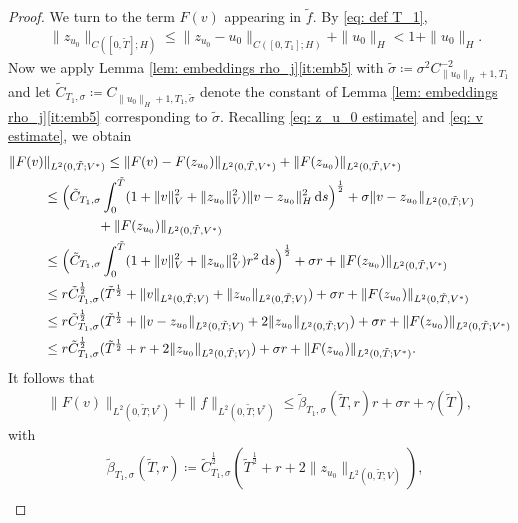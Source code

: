 \documentclass{amsart}
\newcommand{\dd}{\,\mathrm{d}}
\newcommand{\<}{\langle}
\newcommand{\?}{\rangle}
\theoremstyle{plain}
\theoremstyle{remark}
\theoremstyle{plain}
\numberwithin{equation}{section}
\begin{document}
\begin{proof}
We turn to the term $F(v)$ appearing in $\tilde{f}$.
By \eqref{eq: def T_1},
\begin{align}\label{eq: z_u_0 estimate}
& \|z_{u_0}\|_{C([0,\tilde{T}];H)}\leq \|z_{u_0}-u_0\|_{C([0,T_1];H)}+\|u_0\|_H<1+\|u_0\|_H.
\end{align}
Now we apply  Lemma \ref{lem: embeddings rho_j}\ref{it:emb5} with  $\tilde{\sigma}\coloneqq \sigma^2{C}_{\|u_0\|_H+1,T_1}^{-2}$ and let  
 $\tilde{C}_{T_1,\sigma}\coloneqq C_{\|u_0\|_H+1,T_1,\tilde{\sigma}}$ denote the constant of Lemma \ref{lem: embeddings rho_j}\ref{it:emb5} corresponding to $\tilde{\sigma}$. 
Recalling \eqref{eq: z_u_0 estimate} and \eqref{eq: v estimate}, we obtain
\begin{align*}
  \|F(v)&\|_{L^2(0,\tilde{T};V^*)}\leq \|F(v)-F(z_{u_0})\|_{L^2(0,\tilde{T},V^*)}+\|F(z_{u_0})\|_{L^2(0,\tilde{T},V^*)}\notag\\
  &\leq \Big(\tilde{C}_{T_1,\sigma}\int_0^{\tilde{T}}(1+\|v\|_V^2+\|z_{u_0}\|_V^2)\|v-z_{u_0}\|_H^2\dd s\Big)^{\frac{1}{2}} +\sigma 
  \|v-z_{u_0}\|_{L^2(0,\tilde{T};V)}\notag\\
  &\qquad\qquad+\|F(z_{u_0})\|_{L^2(0,\tilde{T},V^*)}\notag\\
  &\leq \Big(\tilde{C}_{T_1,\sigma}\int_0^{\tilde{T}}(1+\|v\|_V^2+\|z_{u_0}\|_V^2)r^2\dd s\Big)^{\frac{1}{2}}
  +\sigma r 
  +\|F(z_{u_0})\|_{L^2(0,\tilde{T},V^*)}\notag\\
&\leq r\tilde{C}_{T_1,\sigma}^{\frac{1}{2}}(\tilde{T}^{\frac{1}{2}}+\|v\|_{L^2(0,\tilde{T};V)}+\|z_{u_0}\|_{L^2(0,\tilde{T};V)})+\sigma r 
+\|F(z_{u_0})\|_{L^2(0,\tilde{T},V^*)} \notag\\
&\leq r\tilde{C}_{T_1,\sigma}^{\frac{1}{2}}(\tilde{T}^{\frac{1}{2}}+\|v-z_{u_0}\|_{L^2(0,\tilde{T};V)}
+2\|z_{u_0}\|_{L^2(0,\tilde{T};V)})+\sigma r 
+\|F(z_{u_0})\|_{L^2(0,\tilde{T};V^*)} \notag\\
&\leq r\tilde{C}_{T_1,\sigma}^{\frac{1}{2}}(\tilde{T}^{\frac{1}{2}}+r+2\|z_{u_0}\|_{L^2(0,\tilde{T};V)})+\sigma r 
+\|F(z_{u_0})\|_{L^2(0,\tilde{T};V^*)}.
\end{align*} 
It follows that
\begin{align}\label{eq: estimate F(v) direct}
\|F(v)\|_{L^2(0,\tilde{T};V^*)}+ \|f\|_{L^2(0,\tilde{T};V^*)}\leq \tilde{\beta}_{T_1,\sigma}(\tilde{T},r)r+\sigma r 
+\gamma(\tilde{T}),
\end{align}
with
\begin{align*}
&\tilde{\beta}_{T_1,\sigma}(\tilde{T},r)\coloneqq \tilde{C}_{T_1,\sigma}^{\frac{1}{2}}(\tilde{T}^{\frac{1}{2}}+r+2\|z_{u_0}\|_{L^2(0,\tilde{T};V)}),\\ 

\end{align*}
\end{proof}
\end{document}
